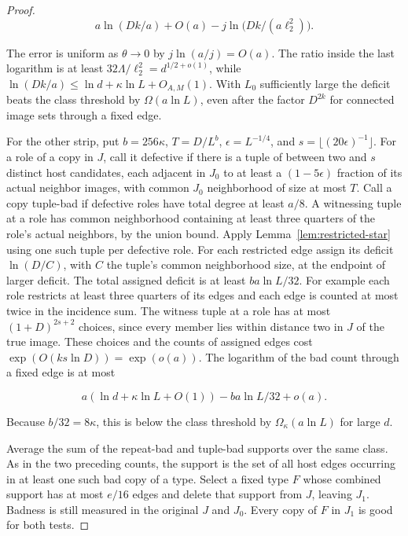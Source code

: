 \documentclass[11pt]{amsart}
\theoremstyle{definition}
\theoremstyle{remark}
\numberwithin{equation}{section}
\begin{document}
\begin{proof}
\begin{equation}
a\ln(Dk/a)+O(a)-j\ln\bigl(Dk/(a\ell_2^2)\bigr).
\end{equation}

The error is uniform as $\theta\to0$ by $ j\ln(a/j)=O(a)$. The ratio inside the last logarithm is at least $32\Lambda/\ell_2^2=d^{1/2+o(1)}$, while $\ln(Dk/a)\le\ln d+\kappa\ln L+O_{A,M}(1)$. With $ L_0$ sufficiently large the deficit beats the class threshold by $\Omega(a\ln L)$, even after the factor $ D^{2k}$ for connected image sets through a fixed edge.

For the other strip, put $b=256\kappa $, $ T=D/L^b $, $\epsilon=L^{-1/4}$, and $ s=\lfloor(20\epsilon)^{-1}\rfloor $. For a role of a copy in $ J $, call it defective if there is a tuple of between two and $ s $ distinct host candidates, each adjacent in $ J_0$ to at least a $(1-5\epsilon)$ fraction of its actual neighbor images, with common $ J_0$ neighborhood of size at most $ T $. Call a copy tuple-bad if defective roles have total degree at least $ a/8$. A witnessing tuple at a role has common neighborhood containing at least three quarters of the role's actual neighbors, by the union bound. Apply Lemma~\ref{lem:restricted-star} using one such tuple per defective role. For each restricted edge assign its deficit $\ln(D/C)$, with $ C $ the tuple's common neighborhood size, at the endpoint of larger deficit. The total assigned deficit is at least $ b a\ln L/32$. For example each role restricts at least three quarters of its edges and each edge is counted at most twice in the incidence sum. The witness tuple at a role has at most $(1+D)^{2s+2}$ choices, since every member lies within distance two in $ J $ of the true image. These choices and the counts of assigned edges cost $\exp(O(k s\ln D))=\exp(o(a))$. The logarithm of the bad count through a fixed edge is at most

\begin{equation}
a(\ln d+\kappa\ln L+O(1))-b a\ln L/32+o(a).
\end{equation}

Because $b/32=8\kappa $, this is below the class threshold by $\Omega_\kappa(a\ln L)$ for large $ d$.

Average the sum of the repeat-bad and tuple-bad supports over the same class. As in the two preceding counts, the support is the set of all host edges occurring in at least one such bad copy of a type. Select a fixed type $F $ whose combined support has at most $ e/16$ edges and delete that support from $ J $, leaving $ J_1$. Badness is still measured in the original $ J $ and $ J_0$. Every copy of $ F $ in $ J_1$ is good for both tests.


\end{proof}
\end{document}
